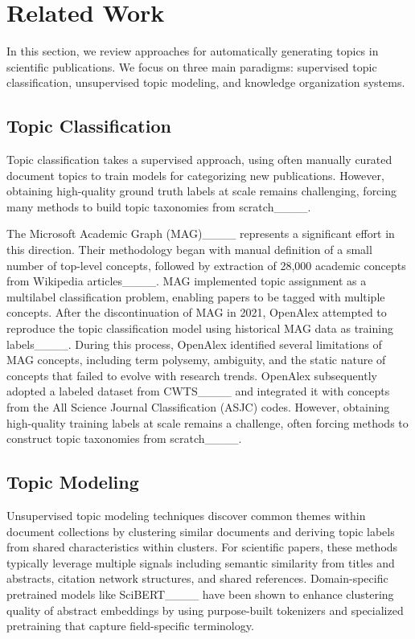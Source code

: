 \section{Related Work}
In this section, we review approaches for automatically generating topics in scientific publications. We focus on three main paradigms: supervised topic classification, unsupervised topic modeling, and knowledge organization systems.

\subsection{Topic Classification} Topic classification takes a supervised approach, using often manually curated document topics to train models for categorizing new publications. However, obtaining high-quality ground truth labels at scale remains challenging, forcing many methods to build topic taxonomies from scratch____.

The Microsoft Academic Graph (MAG)____ represents a significant effort in this direction. 
Their methodology began with manual definition of a small number of top-level concepts, followed by extraction of 28,000 academic concepts from Wikipedia articles____. MAG implemented topic assignment as a multilabel classification problem, enabling papers to be tagged with multiple concepts.
After the discontinuation of MAG in 2021, OpenAlex attempted to reproduce the topic classification model using historical MAG data as training labels____. During this process, OpenAlex identified several limitations of MAG concepts, including term polysemy, ambiguity, and the static nature of concepts that failed to evolve with research trends.
OpenAlex subsequently adopted a labeled dataset from CWTS____ and integrated it with concepts from the All Science Journal Classification (ASJC) codes. 
However, obtaining high-quality training labels at scale remains a challenge, often forcing methods to construct topic taxonomies from scratch____.


\subsection{Topic Modeling} 
Unsupervised topic modeling techniques discover common themes within document collections by clustering similar documents and deriving topic labels from shared characteristics within clusters.
For scientific papers, these methods typically leverage multiple signals including semantic similarity from titles and abstracts, citation network structures, and shared references.
Domain-specific pretrained models like SciBERT____ have been shown to enhance clustering quality of abstract embeddings by using purpose-built tokenizers and specialized pretraining that capture field-specific terminology.


